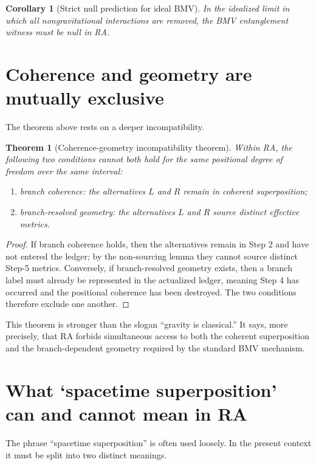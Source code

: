 \documentclass[11pt]{article}
\newtheorem{theorem}{Theorem}
\newtheorem{corollary}{Corollary}
\begin{document}
\begin{corollary}[Strict null prediction for ideal BMV]
In the idealized limit in which all nongravitational interactions are removed, the BMV entanglement witness must be null in RA.
\end{corollary}

\section{Coherence and geometry are mutually exclusive}

The theorem above rests on a deeper incompatibility.

\begin{theorem}[Coherence-geometry incompatibility theorem]
Within RA, the following two conditions cannot both hold for the same positional degree of freedom over the same interval:
\begin{enumerate}[label=(\alph*),leftmargin=2.5em]
    \item branch coherence: the alternatives $L$ and $R$ remain in coherent superposition;
    \item branch-resolved geometry: the alternatives $L$ and $R$ source distinct effective metrics.
\end{enumerate}
\end{theorem}

\begin{proof}
If branch coherence holds, then the alternatives remain in Step 2 and have not entered the ledger; by the non-sourcing lemma they cannot source distinct Step-5 metrics. Conversely, if branch-resolved geometry exists, then a branch label must already be represented in the actualized ledger, meaning Step 4 has occurred and the positional coherence has been destroyed. The two conditions therefore exclude one another. \qedhere
\end{proof}

This theorem is stronger than the slogan ``gravity is classical.'' It says, more precisely, that RA forbids simultaneous access to both the coherent superposition and the branch-dependent geometry required by the standard BMV mechanism.

\section{What `spacetime superposition' can and cannot mean in RA}

The phrase ``spacetime superposition'' is often used loosely. In the present context it must be split into two distinct meanings.
\end{document}

